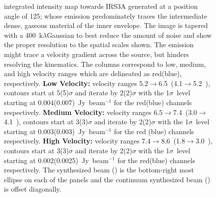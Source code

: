 \begin{figure}[H]
   \caption{\htcop\space integrated intensity map towards IRS3A generated at a position angle of 125\deg; whose emission predominately traces the intermediate dense, gaseous material of the inner envelope. The image is tapered with a 400~k$\lambda$\space Gaussian to best reduce the amount of noise and show the proper resolution to the spatial scales shown. The \htcop\space emission might trace a velocity gradient across the source, but  hinders resolving the kinematics. The columns correspond to low, medium, and high velocity ranges which are delineated as red(blue), respectively. \textbf{Low Velocity:} velocity ranges 5.2$\rightarrow$6.5~\kms (4.1$\rightarrow$5.2~\kms), contours start at 5(5)$\sigma$ and iterate by 2(2)$\sigma$ with the 1$\sigma$~level starting at 0.004(0.007)~Jy~beam$^{-1}$ for the red(blue) channels respectively. \textbf{Medium Velocity:}  velocity ranges 6.5$\rightarrow$7.4~\kms (3.0$\rightarrow$4.1~\kms), contours start at 3(3)$\sigma$ and iterate by 2(2)$\sigma$ with the 1$\sigma$~level starting at 0.003(0.003)~Jy~beam$^{-1}$ for the red (blue) channels respectively. \textbf{High Velocity:} velocity ranges 7.4$\rightarrow$8.6~\kms (1.8$\rightarrow$3.0~\kms), contours start at 3(3)$\sigma$ and iterate by 2(2)$\sigma$ with the 1$\sigma$~level starting at 0.002(0.0025)~Jy~beam$^{-1}$ for the red(blue) channels respectively. The \htcop\space synthesized beam (\htcopbeam) is the bottom-right most ellipse on each of the panels and the continuum synthesized beam (\contbeam) is offset diagonally.}\label{fig:irs3ah13copmoment}
\end{figure}


